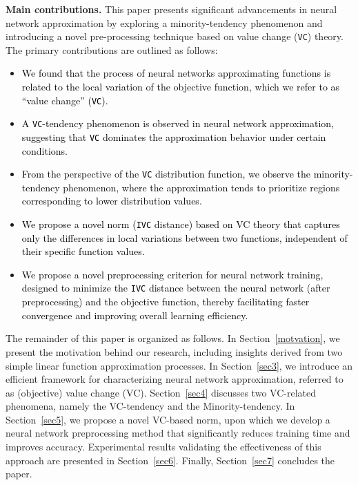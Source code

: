 \documentclass[final]{siamart220329}
\newtheorem{theoretical insights}{Theoretical insights}
\newtheorem{practical takeaway}{Practical takeaway}
\begin{document}
 {\bf Main contributions.}
 This paper presents significant advancements in neural network approximation by exploring a minority-tendency phenomenon and introducing a novel pre-processing technique based on value change (\texttt{VC}) theory. The primary contributions are outlined as follows:

 \begin{itemize}
     \item[-] \textcolor{black}{We found that the process of neural networks approximating functions is related to the local variation of the objective function, which we refer to as ``value change'' (\texttt{VC}).}
 

     \item[-] \textcolor{black}{A \texttt{VC}-tendency phenomenon is observed in neural network approximation, suggesting that \texttt{VC} dominates the approximation behavior under certain conditions.}

     \item[-] \textcolor{black}{From the perspective of the \texttt{VC} distribution function, we observe the minority-tendency phenomenon, where the approximation tends to prioritize regions corresponding to lower distribution values.}


     \item[-] \textcolor{black}{We propose a novel norm (\texttt{IVC} distance) based on VC theory that captures only the differences in local variations between two functions, independent of their specific function values.}

     \item[-] \textcolor{black}{We propose a novel preprocessing criterion for neural network training, designed to minimize the \texttt{IVC} distance between the neural network (after preprocessing) and the objective function, thereby facilitating faster convergence and improving overall learning efficiency.}

 
 \end{itemize}
 

The remainder of this paper is organized as follows. In Section~\ref{motvation}, we present the motivation behind our research, including insights derived from two simple linear function approximation processes. In Section~\ref{sec3}, we introduce an efficient framework for characterizing neural network approximation, referred to as (objective) value change (VC). Section~\ref{sec4} discusses two VC-related phenomena, namely the VC-tendency and the Minority-tendency. In Section~\ref{sec5}, we propose a novel VC-based norm, upon which we develop a neural network preprocessing method that significantly reduces training time and improves accuracy. Experimental results validating the effectiveness of this approach are presented in Section~\ref{sec6}.
Finally, Section~\ref{sec7} concludes the paper. 
\end{document}
